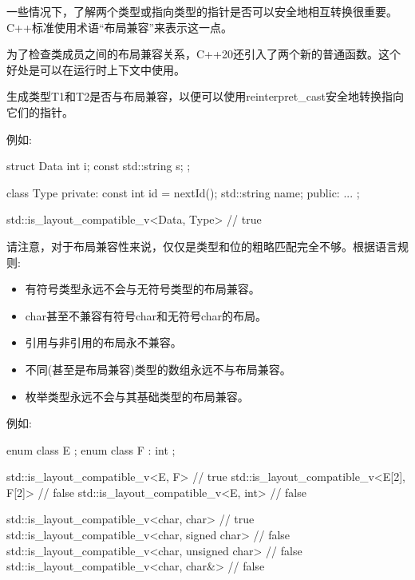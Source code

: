 
一些情况下，了解两个类型或指向类型的指针是否可以安全地相互转换很重要。C++标准使用术语“布局兼容”来表示这一点。

为了检查类成员之间的布局兼容关系，C++20还引入了两个新的普通函数。这个好处是可以在运行时上下文中使用。



生成类型T1和T2是否与布局兼容，以便可以使用reinterpret\_cast安全地转换指向它们的指针。

例如:

\begin{cpp}
struct Data {
	int i;
	const std::string s;
};

class Type {
	private:
	const int id = nextId();
	std::string name;
	public:
	...
};

std::is_layout_compatible_v<Data, Type> // true
\end{cpp}

请注意，对于布局兼容性来说，仅仅是类型和位的粗略匹配完全不够。根据语言规则:

\begin{itemize}
\item 
有符号类型永远不会与无符号类型的布局兼容。

\item 
char甚至不兼容有符号char和无符号char的布局。

\item 
引用与非引用的布局永不兼容。

\item 
不同(甚至是布局兼容)类型的数组永远不与布局兼容。

\item 
枚举类型永远不会与其基础类型的布局兼容。
\end{itemize}

例如:

\begin{cpp}
enum class E {};
enum class F : int {};

std::is_layout_compatible_v<E, F> // true
std::is_layout_compatible_v<E[2], F[2]> // false
std::is_layout_compatible_v<E, int> // false

std::is_layout_compatible_v<char, char> // true
std::is_layout_compatible_v<char, signed char> // false
std::is_layout_compatible_v<char, unsigned char> // false
std::is_layout_compatible_v<char, char&> // false
\end{cpp}

